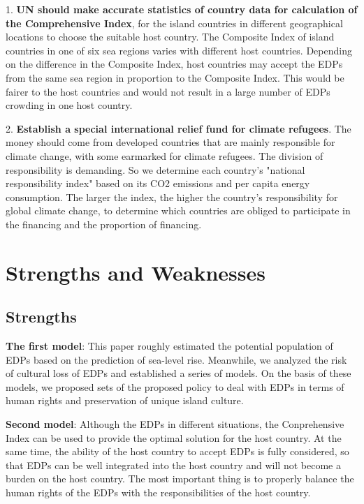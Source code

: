 \documentclass[12pt]{article}  %
\begin{document}
1. \textbf{UN should make accurate statistics of country data for calculation of the Comprehensive Index}, for the island countries in different geographical locations to choose the suitable host country. The Composite Index of island countries in one of six sea regions varies with different host countries. Depending on the difference in the Composite Index, host countries may accept the EDPs from the same sea region in proportion to the Composite Index. This would be fairer to the host countries and would not result in a large number of EDPs crowding in one host country.




2. \textbf{Establish a special international relief fund for climate refugees}. The money should come from developed countries that are mainly responsible for climate change, with some earmarked for climate refugees. The division of responsibility is demanding. So we determine each country's "national responsibility index" based on its CO2 emissions and per capita energy consumption. The larger the index, the higher the country's responsibility for global climate change, to determine which countries are obliged to participate in the financing and the proportion of financing.






\section{Strengths and Weaknesses}



\subsection{Strengths}

\textbf{The first model}: This paper roughly estimated the potential population of EDPs based on the prediction of sea-level rise. Meanwhile, we analyzed the risk of cultural loss of EDPs and established a series of models. On the basis of these models, we proposed sets of the proposed policy to deal with EDPs in terms of human rights and  preservation of unique island culture.


\textbf{Second model}: Although the EDPs in different situations, the Conprehensive Index can be used to provide the optimal solution for the host country. At the same time, the ability of the host country to accept EDPs is fully considered, so that EDPs can be well integrated into the host country and will not become a burden on the host country. The most important thing is to properly balance the human rights of the EDPs with the responsibilities of the host country.
\end{document}
